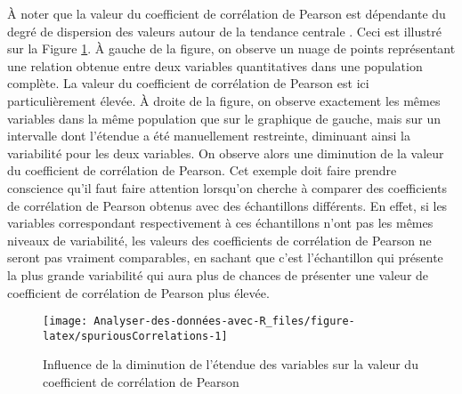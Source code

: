 \documentclass[
  french,
]{book}
\begin{document}
À noter que la valeur du coefficient de corrélation de Pearson est dépendante du degré de dispersion des valeurs autour de la tendance centrale \autocite{halperinSpuriousCorrelationsCauses1986}. Ceci est illustré sur la Figure \ref{fig:spuriousCorrelations}. À gauche de la figure, on observe un nuage de points représentant une relation obtenue entre deux variables quantitatives dans une population complète. La valeur du coefficient de corrélation de Pearson est ici particulièrement élevée. À droite de la figure, on observe exactement les mêmes variables dans la même population que sur le graphique de gauche, mais sur un intervalle dont l'étendue a été manuellement restreinte, diminuant ainsi la variabilité pour les deux variables. On observe alors une diminution de la valeur du coefficient de corrélation de Pearson. Cet exemple doit faire prendre conscience qu'il faut faire attention lorsqu'on cherche à comparer des coefficients de corrélation de Pearson obtenus avec des échantillons différents. En effet, si les variables correspondant respectivement à ces échantillons n'ont pas les mêmes niveaux de variabilité, les valeurs des coefficients de corrélation de Pearson ne seront pas vraiment comparables, en sachant que c'est l'échantillon qui présente la plus grande variabilité qui aura plus de chances de présenter une valeur de coefficient de corrélation de Pearson plus élevée.

\begin{figure}

{\centering \texttt{[image: Analyser-des-données-avec-R\_files/figure-latex/spuriousCorrelations-1]} 

}

\caption{Influence de la diminution de l'étendue des variables sur la valeur du coefficient de corrélation de Pearson}\label{fig:spuriousCorrelations}
\end{figure}
\end{document}
